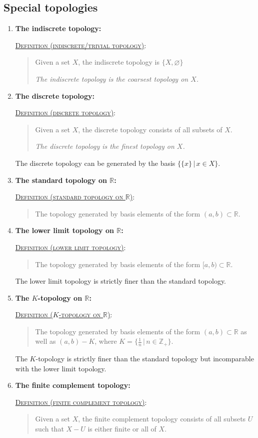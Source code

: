 \documentclass[letterpaper, 12pt]{article}
\newcommand{\RR}{\mathbb{R}}
\newcommand{\ZZ}{\mathbb{Z}}
\newcommand{\defn}[2]{\textsc{\underline{Definition (#1)}:}\begin{quote} #2\end{quote}}
\let\emptyset\varnothing
\begin{document}
    \subsection{Special topologies}
        \begin{enumerate}[resume]
        \item \textbf{The indiscrete topology:}

        \defn{indiscrete/trivial topology}{Given a set $X$, the indiscrete topology is $\{X, \emptyset\}$

        \textit{The indiscrete topology is the coarsest topology on $X$.}}
        \item \textbf{The discrete topology:}

        \defn{discrete topology}{Given a set $X$, the discrete topology consists of all subsets of $X$.

        \textit{The discrete topology is the finest topology on $X$.}}

        The discrete topology can be generated by the basis $\{\{x\}\,|\,x\in X\}$.
        \item \textbf{The standard topology on $\RR$:}

        \defn{standard topology on $\RR$}{The topology generated by basis elements of the form $(a, b) \subset\RR$.}
        \item \textbf{The lower limit topology on $\RR$:}

        \defn{lower limit topology}{The topology generated by basis elements of the form $[a, b)\subset\RR$.}

        The lower limit topology is strictly finer than the standard topology.
        \item \textbf{The $K$-topology on $\RR$:}

        \defn{$K$-topology on $\RR$}{The topology generated by basis elements of the form $(a, b)\subset\RR$ as well as $(a, b) - K$, where $K = \{\tfrac{1}{n}\,|\,n\in\ZZ_+\}$.}

        The $K$-topology is strictly finer than the standard topology but incomparable with the lower limit topology.
        \item \textbf{The finite complement topology:}

        \defn{finite complement topology}{Given a set $X$, the finite complement topology consists of all subsets $U$ such that $X-U$ is either finite or all of $X$.}
        \end{enumerate}
\end{document}

